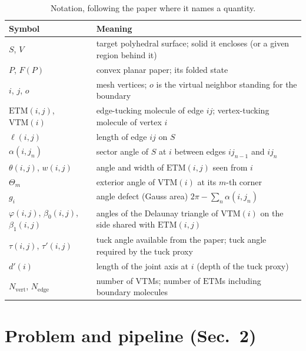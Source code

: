 \documentclass[11pt]{article}
\theoremstyle{definition}
\newcommand{\ETM}{\mathrm{ETM}}
\newcommand{\VTM}{\mathrm{VTM}}
\newcommand{\Nv}{N_{\mathrm{vert}}}
\newcommand{\Ne}{N_{\mathrm{edge}}}
\begin{document}
\begin{table}[ht]
\centering
\small
\begin{tabular}{@{}ll@{}}
\toprule
Symbol & Meaning \\
\midrule
$S$, $V$ & target polyhedral surface; solid it encloses (or a given region behind it) \\
$P$, $F(P)$ & convex planar paper; its folded state \\
$i$, $j$, $o$ & mesh vertices; $o$ is the virtual neighbor standing for the boundary \\
$\ETM(i,j)$, $\VTM(i)$ & edge-tucking molecule of edge $ij$; vertex-tucking molecule of vertex $i$ \\
$\ell(i,j)$ & length of edge $ij$ on $S$ \\
$\alpha(i,j_n)$ & sector angle of $S$ at $i$ between edges $ij_{n-1}$ and $ij_n$ \\
$\theta(i,j)$, $w(i,j)$ & angle and width of $\ETM(i,j)$ seen from $i$ \\
$\Theta_m$ & exterior angle of $\VTM(i)$ at its $m$-th corner \\
$g_i$ & angle defect (Gauss area) $2\pi - \sum_n \alpha(i,j_n)$ \\
$\varphi(i,j)$, $\beta_0(i,j)$, $\beta_1(i,j)$ & angles of the Delaunay triangle of $\VTM(i)$ on the side shared with $\ETM(i,j)$ \\
$\tau(i,j)$, $\tau'(i,j)$ & tuck angle available from the paper; tuck angle required by the tuck proxy \\
$d'(i)$ & length of the joint axis at $i$ (depth of the tuck proxy) \\
$\Nv$, $\Ne$ & number of $\VTM$s; number of $\ETM$s including boundary molecules \\
\bottomrule
\end{tabular}
\caption{Notation, following the paper where it names a quantity.}
\end{table}

\section{Problem and pipeline (Sec.~2)}
\end{document}
